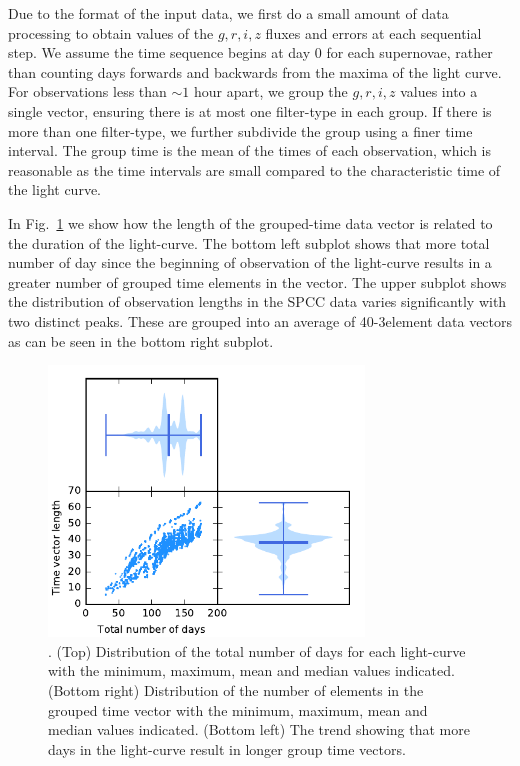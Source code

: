 \documentclass[twocolumn]{aastex61}
\begin{document}
Due to the format of the input data, we first do a small amount of data processing to obtain values of the $g,r,i,z$ fluxes and errors at each sequential step.  We assume the time sequence begins at day 0 for each supernovae, rather than counting days forwards and backwards from the maxima of the light curve. For observations less than $\sim1$ hour apart, we group the $g,r,i,z$ values into a single vector, ensuring there is at most one filter-type in each group. If there is more than one filter-type, we further subdivide the group using a finer time interval.  The group time is the mean of the times of each observation, which is reasonable as the time intervals are small compared to the characteristic time of the light curve. 

In Fig.~\ref{fig:violinplot} we show how the length of the grouped-time data vector is related to the duration of the light-curve. The bottom left subplot shows that more total number of day since the beginning of observation of the light-curve results in a greater number of grouped time elements in the vector. The upper subplot shows the distribution of observation lengths in the SPCC data varies significantly with two distinct peaks. These are grouped into an average of 40-3element data vectors as can be seen in the bottom right subplot.

\begin{figure}
\centering
\includegraphics[width=84mm, angle=0]{f2.pdf}
\caption{\label{fig:violinplot}. (Top) Distribution of the total number of days for each light-curve with the minimum, maximum, mean and median values indicated. (Bottom right) Distribution of the number of elements in the grouped time vector with the minimum, maximum, mean and median values indicated. (Bottom left) The trend showing that more days in the light-curve result in longer group time vectors.
 }
\end{figure}
\end{document}
